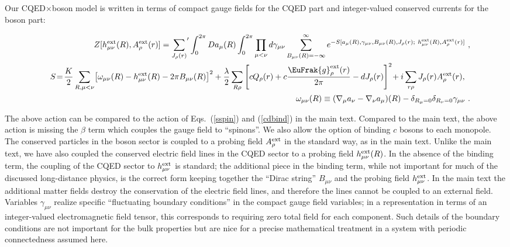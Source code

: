 \documentclass[prb,twocolumn]{revtex4-1}
\def\cJ{{J}}
\def\cQ{{Q}}
\def\Aext{A^{\rm ext}}
\def\hext{h^{\rm ext}}
\def\uu{B}
\begin{document}
Our CQED$\times$boson model is written in terms of compact gauge fields for the CQED part and integer-valued conserved currents for the boson part:
\begin{widetext}
\begin{eqnarray}
&& Z[\hext_{\mu\nu}(R), \Aext_\rho(r)] = {\sum_{\cJ_\rho(r)}}^\prime \int_0^{2\pi} Da_\mu(R) \int_0^{2\pi} \prod_{\mu < \nu} d\gamma_{\mu\nu} \sum_{\uu_{\mu\nu}(R) = -\infty}^\infty
e^{-S[a_\mu(R), \gamma_{\mu\nu}, \uu_{\mu\nu}(R), \cJ_\rho(r);~ \hext_{\mu\nu}(R), \Aext_\rho(r)]} ~,\\
&& S \!=\! \frac{K}{2} \sum_{R, \mu < \nu} \! \left[\omega_{\mu\nu}(R) - \hext_{\mu\nu}(R) - 2\pi \uu_{\mu\nu}(R) \right]^2 
+ \frac{\lambda}{2} \sum_{R\rho} \left[c \cQ_\rho(r) + c \frac{\EuFrak{g}^{\rm ext}_\rho(r)}{2\pi} - d \cJ_\rho(r) \right]^2 
\! + i \sum_{r\rho} \cJ_\rho(r) \Aext_\rho(r) , ~~ \label{Sorig} \\
&& \omega_{\mu\nu}(R) \equiv (\nabla_\mu a_\nu - \nabla_\nu a_\mu)(R) - \delta_{R_\mu = 0} \delta_{R_\nu = 0} \gamma_{\mu\nu} ~.
\label{A1}
\end{eqnarray}
\end{widetext}
The above action can be compared to the action of Eqs.~(\ref{sspin}) and (\ref{cdbind}) in the main text. Compared to the main text, the above action is missing the $\beta$ term which couples the gauge field to ``spinons''. We also allow the option of binding $c$ bosons to each monopole. The conserved particles in the boson sector is coupled to a probing field $\Aext_\rho$ in the standard way, as in the main text. Unlike the main text, we have also coupled the conserved electric field lines in the CQED sector to a probing field $\hext_{\mu\nu}(R)$.  In the absence of the binding term, the coupling of the CQED sector to $\hext_{\mu\nu}$ is standard; the additional piece in the binding term, while not important for much of the discussed long-distance physics, is the correct form keeping together the ``Dirac string'' $\uu_{\mu\nu}$ and the probing field $\hext_{\mu\nu}$. In the main text the additional matter fields destroy the conservation of the electric field lines, and therefore the lines cannot be coupled to an external field.
Variables $\gamma_{\mu\nu}$ realize specific ``fluctuating boundary conditions'' in the compact gauge field variables; in a representation in terms of an integer-valued electromagnetic field tensor, this corresponds to requiring zero total field for each component.  Such details of the boundary conditions are not important for the bulk properties but are nice for a precise mathematical treatment in a system with periodic connectedness assumed here.
\end{document}
